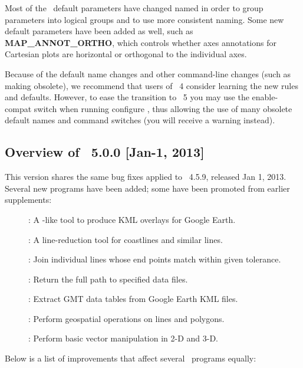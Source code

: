 Most of the \GMT\ default parameters have changed named in order to group parameters into logical groups
and to use more consistent naming.  Some new default parameters have been added as well, such as
\textbf{MAP\_ANNOT\_ORTHO}, which controls whether axes annotations for Cartesian plots are horizontal or
orthogonal to the individual axes.

Because of the default name changes and other command-line changes (such as making  obsolete), we
recommend that users of \GMT\ 4 consider learning the new rules and defaults.  However, to ease the
transition to \GMT\ 5 you may use the \-\-enable-compat switch when running configure , thus allowing the use
of many obsolete default names and command switches (you will receive a warning instead).

\subsection{Overview of \gmt\ 5.0.0 [Jan-1, 2013]}

This version shares the same bug fixes applied to \GMT\ 4.5.9, released Jan 1, 2013.
Several new programs have been added; some have been promoted from earlier supplements:

\begin{description}
	\item []: A -like tool to produce KML overlays for Google Earth.
	\item []: A line-reduction tool for coastlines and similar lines.
	\item []: Join individual lines whose end points match within given tolerance.
	\item []: Return the full path to specified data files.
	\item []: Extract GMT data tables from Google Earth KML files.
	\item []: Perform geospatial operations on lines and polygons.
	\item []: Perform basic vector manipulation in 2-D and 3-D.
\end{description}

\noindent
Below is a list of improvements that affect several \gmt\ programs equally:

